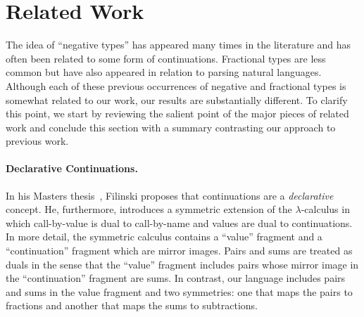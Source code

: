 \documentclass[preprint]{sigplanconf}
\begin{document}



\section{Related Work} 
\label{sec:related}

The idea of ``negative types'' has appeared many times in the literature and
has often been related to some form of continuations. Fractional types are
less common but have also appeared in relation to parsing natural
languages. Although each of these previous occurrences of negative and
fractional types is somewhat related to our work, our results are
substantially different. To clarify this point, we start by reviewing the
salient point of the major pieces of related work and conclude this section
with a summary contrasting our approach to previous work.

\paragraph*{Declarative Continuations.} 
In his Masters thesis~\cite{Filinski:1989:DCI:648332.755574}, Filinski
proposes that continuations are a \emph{declarative} concept. He,
furthermore, introduces a symmetric extension of the $\lambda$-calculus in
which call-by-value is dual to call-by-name and values are dual to
continuations. In more detail, the symmetric calculus contains a ``value''
fragment and a ``continuation'' fragment which are mirror images. Pairs and
sums are treated as duals in the sense that the ``value'' fragment includes
pairs whose mirror image in the ``continuation'' fragment are sums. In
contrast, our language includes pairs and sums in the value fragment and two
symmetries: one that maps the pairs to fractions and another that maps the
sums to subtractions.
\end{document}
